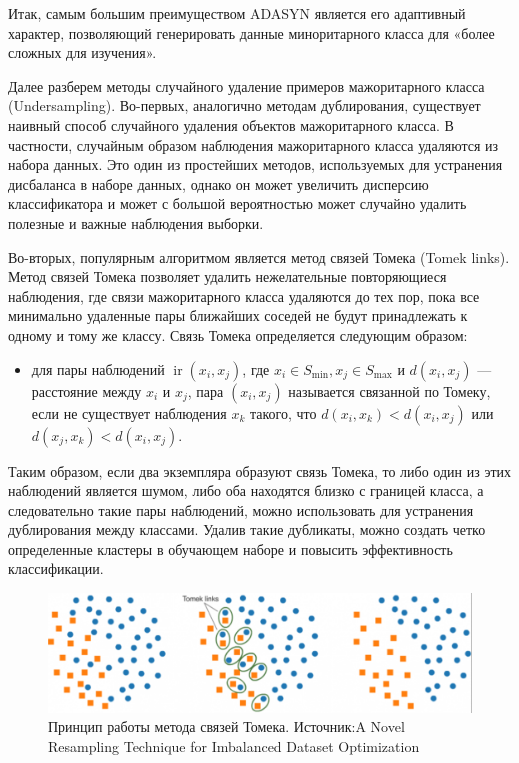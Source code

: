 \documentclass[12pt,a4paper, oneside]{extreport}
\begin{document}
Итак, самым большим преимуществом ADASYN является его адаптивный характер, позволяющий генерировать данные миноритарного класса  для «более сложных для изучения». 


Далее разберем методы 
случайного  удаление примеров мажоритарного класса (Undersampling).  
Во-первых, аналогично методам дублирования, существует наивный способ случайного удаления объектов мажоритарного класса. В частности,  случайным образом наблюдения мажоритарного класса удаляются из набора данных. Это один из простейших методов, используемых для устранения дисбаланса в наборе данных, однако он может увеличить дисперсию классификатора и может с большой вероятностью может  случайно удалить полезные и  важные наблюдения  выборки. 

Во-вторых, популярным алгоритмом является  метод связей Томека (Tomek links). Метод связей Томека позволяет удалить  нежелательные повторяющиеся наблюдения, где связи мажоритарного класса  удаляются до тех пор, пока все минимально удаленные пары ближайших соседей не будут принадлежать к одному и тому же классу. Связь Томека  определяется следующим образом: 
\begin{itemize}
	\item для пары наблюдений  $\operatorname{ir}\left(x_{i}, x_{j}\right)$, где  $x_{i} \in S_{\min }, x_{j} \in S_{\max }$ и $d\left(x_{i}, x_{j}\right)$  — расстояние между $x_{i}$ и  $x_{j}$,  пара  $(x_{i },x_{j})$  называется связанной по  Томеку, если не существует наблюдения  $x_{k}$ такого, что  $d\left(x_{i}, x_{k}\right)<d\left(x_{i}, x_{j}\right)$   или $d\left(x_{j}, x_{k}\right)<d\left(x_{i}, x_{j}\right)$.
\end{itemize}

 Таким образом, если два экземпляра образуют связь  Томека, то либо один из этих наблюдений является шумом, либо оба находятся близко с границей класса, а следовательно такие пары наблюдений, можно использовать для устранения дублирования между классами. Удалив такие дубликаты, можно создать четко определенные кластеры в обучающем наборе и повысить эффективность классификации.


\begin{figure}
	\centering
	\includegraphics[width=0.7\linewidth]{screenshot011}
   \caption{Принцип работы метода связей Томека. Источник:A Novel Resampling Technique for Imbalanced Dataset Optimization}
	\label{fig:screenshot011}
\end{figure}
\end{document}

